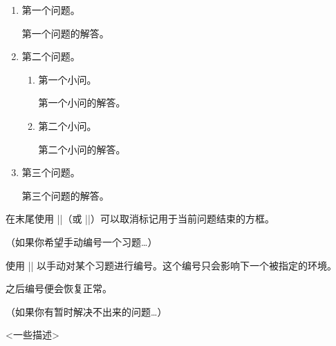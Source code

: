 \documentclass[11pt,
  logo = {example-image},
  title in boldface,
  theorem in new line,
  colored solution,
]{homework}
\begin{document}
\begin{problem}[一个由很多小问题构成的大问题]
    \begin{enumerate}
        \item 第一个问题。

        \begin{solution}
            第一个问题的解答。
        \end{solution}

        \item 第二个问题。

        \begin{enumerate}
            \item 第一个小问。

            \begin{solution}
                第一个小问的解答。
            \end{solution}

            \item 第二个小问。

            \begin{solution}
                第二个小问的解答。
            \end{solution}

        \end{enumerate}

        \item 第三个问题。

        \begin{solution}
            第三个问题的解答。
        \end{solution}

    \end{enumerate}
    在末尾使用 \cverb|\noqed|（或 \cverb|\noQED|）可以取消标记用于当前问题结束的方框。
    \noQED
\end{problem}


\bigskip\textcolor{gray!55}{（如果你希望手动编号一个习题…）}

\begin{exercise}[一个手动编号的习题]
    使用 \cverb|\ManualNumbering| 以手动对某个习题进行编号。这个编号只会影响下一个被指定的环境。
\end{exercise}

\begin{exercise}
    之后编号便会恢复正常。
\end{exercise}


\bigskip\textcolor{gray!55}{（如果你有暂时解决不出来的问题…）}

\DNF<一些描述>
\end{document}
